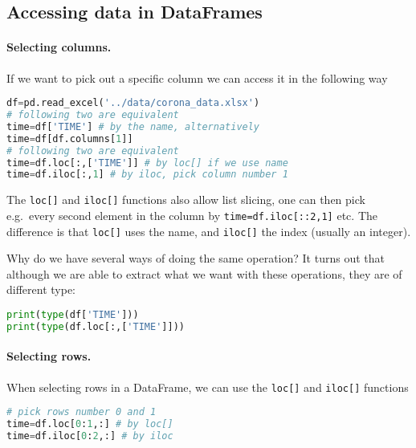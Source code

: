 \documentclass[graybox,sectrefs,envcountresetchap,open=right,final]{svmonodo}
\begin{document}
\subsection{Accessing data in  DataFrames}

\paragraph{Selecting columns.}
If we want to pick out a specific column we can access it in the following way








\begin{lstlisting}[language=python,style=blue1bar]
df=pd.read_excel('../data/corona_data.xlsx') 
# following two are equivalent
time=df['TIME'] # by the name, alternatively
time=df[df.columns[1]]
# following two are equivalent
time=df.loc[:,['TIME']] # by loc[] if we use name
time=df.iloc[:,1] # by iloc, pick column number 1

\end{lstlisting}

The \texttt{loc[]} and \texttt{iloc[]} functions also allow list slicing, one can then pick e.g.~every second element in the column by \texttt{time=df.iloc[::2,1]} etc. The difference is that \texttt{loc[]} uses the name, and \texttt{iloc[]} the index (usually an integer). 

Why do we have several ways of doing the same operation? It turns out that although we are able to extract what we want with these operations, they are of different type:



\begin{lstlisting}[language=python,style=blue1bar]
print(type(df['TIME']))
print(type(df.loc[:,['TIME']]))

\end{lstlisting}

\paragraph{Selecting rows.}
When selecting rows in a DataFrame, we can use the \texttt{loc[]} and \texttt{iloc[]} functions




\begin{lstlisting}[language=python,style=blue1bar]
# pick rows number 0 and 1
time=df.loc[0:1,:] # by loc[] 
time=df.iloc[0:2,:] # by iloc

\end{lstlisting}
\end{document}
